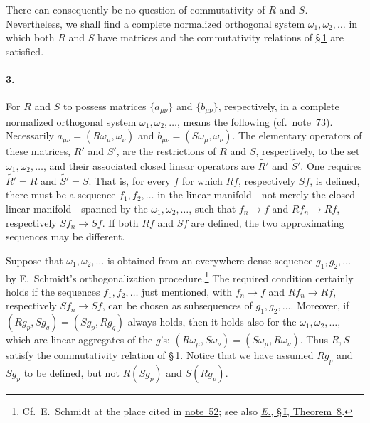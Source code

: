 \documentclass[
  paper=b5,
  twoside=true,
  fontsize=13pt,
  headings=normal,
  bookmarkpackage=false
]{scrartcl}
\theoremstyle{definition}
\newcommand{\NoteRef}[1]{\hyperref[fn:#1]{note~#1}}
\newcommand{\ErefText}[1]{\href{https://doi.org/10.1007/BF01782338}{#1}}
\begin{document}
There can consequently be no question of commutativity of \(R\) and
\(S\).  Nevertheless, we shall find a complete normalized orthogonal
system \(\omega_{1},\omega_{2},\ldots\) in which both \(R\) and \(S\)
have matrices and the commutativity relations of \hyperref[app:III-1]{\S\,1} are satisfied.

\paragraph*{3.}
\label{app:III-3}

For \(R\) and \(S\) to possess matrices \(\{a_{\mu\nu}\}\) and
\(\{b_{\mu\nu}\}\), respectively, in a complete normalized orthogonal
system \(\omega_{1},\omega_{2},\ldots\), means the following
(cf.\ \NoteRef{73}). Necessarily \(a_{\mu\nu}=(R\omega_{\mu},\omega_{\nu})\)
and \(b_{\mu\nu}=(S\omega_{\mu},\omega_{\nu})\). The elementary operators of these matrices, \(R'\) and \(S'\), are the
restrictions of \(R\) and \(S\), respectively, to the set
\(\omega_{1},\omega_{2},\ldots\), and their associated closed linear
operators are \(\widetilde{R'}\) and \(\widetilde{S'}\). One requires
\(\widetilde{R'}=R\) and \(\widetilde{S'}=S\). That is, for every \(f\) for which \(Rf\), respectively \(Sf\), is
defined, there must be a sequence \(f_{1},f_{2},\ldots\) in the linear
manifold---not merely the closed linear manifold---spanned by the
\(\omega_{1},\omega_{2},\ldots\), such that \(f_n\to f\) and \(Rf_n\to Rf\), respectively \(Sf_n\to Sf\).
If both \(Rf\) and \(Sf\) are defined, the two approximating sequences
may be different.

Suppose that \(\omega_{1},\omega_{2},\ldots\) is obtained from an
everywhere dense sequence \(g_{1},g_{2},\ldots\) by E.~Schmidt's
orthogonalization procedure.\footnote{\label{fn:75}Cf.\ E.~Schmidt at the place cited
in \NoteRef{52}; see also \ErefText{\emph{E.}, \S\,I, Theorem~8}.}
The required condition certainly holds if the sequences
\(f_{1},f_{2},\ldots\) just mentioned, with \(f_n\to f\) and \(Rf_n\to Rf\), respectively
\(Sf_n\to Sf\), can be chosen as subsequences of \(g_{1},g_{2},\ldots\).
Moreover, if \((Rg_p,Sg_q)=(Sg_p,Rg_q)\) always holds, then it holds
also for the \(\omega_{1},\omega_{2},\ldots\), which are linear aggregates
of the \(g\)'s: \((R\omega_{\mu},S\omega_{\nu})
=(S\omega_{\mu},R\omega_{\nu})\). Thus \(R,S\) satisfy the commutativity relation of \hyperref[app:III-1]{\S\,1}.  Notice that we
have assumed \(Rg_p\) and \(Sg_p\) to be defined, but not
\(R(Sg_p)\) and \(S(Rg_p)\).
\end{document}
